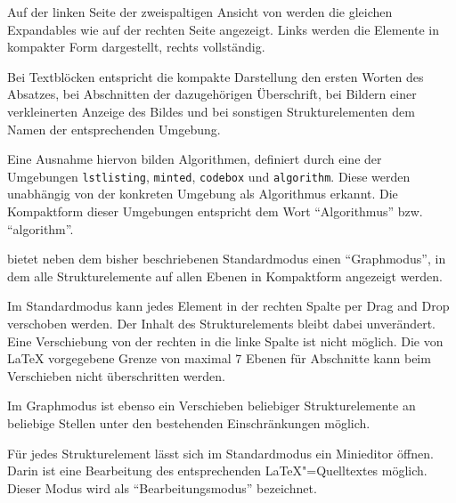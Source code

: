 \clearpage


Auf der linken Seite der zweispaltigen Ansicht von \texla{} werden die gleichen Expandables wie auf der rechten Seite
angezeigt.
Links werden die Elemente in kompakter Form dargestellt, rechts vollständig.

Bei Textblöcken entspricht die kompakte Darstellung den ersten Worten des Absatzes, bei Abschnitten der dazugehörigen
Überschrift, bei Bildern einer verkleinerten Anzeige des Bildes und bei sonstigen Strukturelementen dem Namen der
entsprechenden Umgebung.

Eine Ausnahme hiervon bilden Algorithmen, definiert durch eine der Umgebungen \verb|lstlisting|, \verb|minted|,
\verb|codebox| und \verb|algorithm|.
Diese werden unabhängig von der konkreten Umgebung als Algorithmus erkannt.
Die Kompaktform dieser Umgebungen entspricht dem Wort \enquote{Algorithmus} bzw. \enquote{algorithm}.


\texla{} bietet neben dem bisher beschriebenen Standardmodus einen \enquote{Graphmodus}, in dem alle Strukturelemente
auf allen Ebenen in Kompaktform angezeigt werden.


Im Standardmodus kann jedes Element in der rechten Spalte per Drag and Drop verschoben werden.
Der Inhalt des Strukturelements bleibt dabei unverändert.
Eine Verschiebung von der rechten in die linke Spalte ist nicht möglich.
Die von \LaTeX{} vorgegebene Grenze von maximal 7 Ebenen für Abschnitte kann beim Verschieben nicht überschritten
werden.

Im Graphmodus ist ebenso ein Verschieben beliebiger Strukturelemente an beliebige Stellen unter den bestehenden
Einschränkungen möglich.


Für jedes Strukturelement lässt sich im Standardmodus ein Minieditor öffnen.
Darin ist eine Bearbeitung des entsprechenden \LaTeX"=Quelltextes möglich.
Dieser Modus wird als \enquote{Bearbeitungsmodus} bezeichnet.

\clearpage


